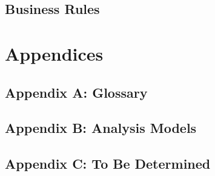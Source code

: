 \documentclass[11pt]{article}
\begin{document}
\subsection{Business Rules}
\label{sec:business}

\section{Appendices}
\label{sec:appendices}

\subsection{Appendix A: Glossary}
\label{sec:glossary}

\subsection{Appendix B: Analysis Models}
\label{sec:analysis}

\subsection{Appendix C: To Be Determined}
\label{sec:tbd}


\end{document}

